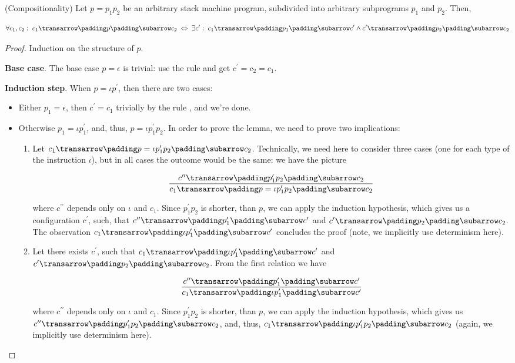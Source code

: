 \begin{lemma} (Compositionality)
  Let $p=p_1p_2$ be an arbitrary stack machine program, subdivided into arbitrary subprograms $p_1$ and $p_2$. Then,

  \[
  \forall c_1, c_2:\;\trans{c_1}{p}{c_2}\;\Leftrightarrow\;\exists c^\prime:\; \trans{c_1}{p_1}{c^\prime} \wedge \trans{c^\prime}{p_2}{c_2}
  \]
\end{lemma}
\begin{proof}
  Induction on the structure of $p$.
  
  \textbf{Base case}. The base case $p=\epsilon$ is trivial: use the rule  and get $c^\prime=c_2=c_1$.
  
  \textbf{Induction step}. When $p=\iota p^\prime$, then there are two cases:

  \begin{itemize}
    \item Either $p_1=\epsilon$, then $c^\prime=c_1$ trivially by the rule , and we're done.
    \item Otherwise $p_1=\iota p_1^\prime$, and, thus, $p=\iota p_1^\prime p_2$. In order to prove the lemma, we need to prove two implications:
      \begin{enumerate}
      \item Let $\trans{c_1}{p=\iota p_1^\prime p_2}{c_2}$. Technically, we need here to consider three cases (one for each type of the instruction
        $\iota$), but in all cases the outcome would be the same: we have the picture

        \[
        \trule{\trans{c^{\prime\prime}}{p_1^\prime p_2}{c_2}}{\trans{c_1}{p=\iota p_1^\prime p_2}{c_2}}
        \]

        where $c^{\prime\prime}$ depends only on $\iota$ and $c_1$. Since $p_1^\prime p_2$ is shorter, than $p$, we can apply the induction hypothesis, which gives us a
        configuration $c^\prime$, such, that $\trans{c^{\prime\prime}}{p_1^\prime}{c^\prime}$ and $\trans{c^\prime}{p_2}{c_2}$. The observation $\trans{c_1}{\iota p_1^\prime}{c^\prime}$
        concludes the proof (note, we implicitly use determinism here).
      \item Let there exists $c^\prime$, such that $\trans{c_1}{\iota p_1^\prime}{c^\prime}$ and $\trans{c^\prime}{p_2}{c_2}$. From the first relation we have

        \[
          \trule{\trans{c^{\prime\prime}}{p_1^\prime}{c^\prime}}{\trans{c_1}{\iota p_1^\prime}{c^\prime}}
        \]

        where $c^{\prime\prime}$ depends only on $\iota$ and $c_1$. Since $p_1^\prime p_2$ is shorter, than $p$, we can apply the induction hypothesis, which
        gives us $\trans{c^{\prime\prime}}{p_1^\prime p_2}{c_2}$, and, thus, $\trans{c_1}{\iota p_1^\prime p_2}{c_2}$ (again, we implicitly use determinism here).
      \end{enumerate}
  \end{itemize}
\end{proof}

